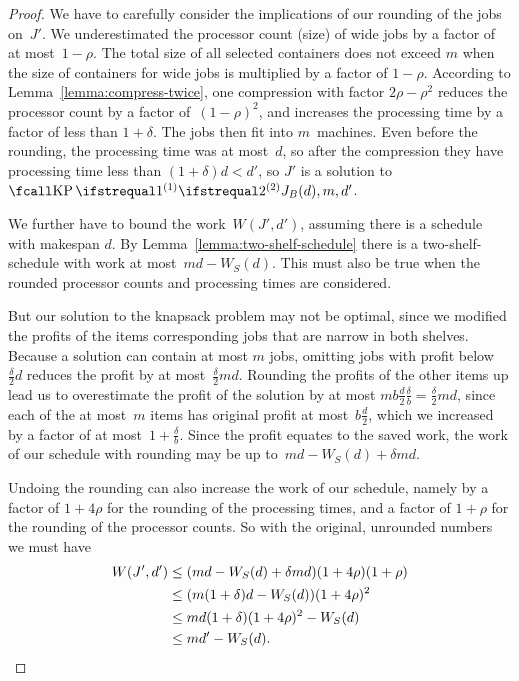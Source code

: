 \begin{proof}
  We have to carefully consider the implications of our rounding of the jobs on~$J'$.
  We underestimated the processor count (size) of wide jobs by a factor of at most~$1 - \rho$.
  The total size of all selected containers does not exceed $m$
  when the size of containers for wide jobs is multiplied by a factor of $1 - \rho$.
  According to Lemma~\ref{lemma:compress-twice},
  one compression with factor $2\rho - \rho^2$ reduces the processor count
  by a factor of~$(1 - \rho)^2$,
  and increases the processing time by a factor of less than $1 + \delta$.
  The jobs then fit into $m$~machines.
  Even before the rounding, the processing time was at most~$d$,
  so after the compression they have processing time
  less than $(1 + \delta) d < d'$,
  so $J'$ is a solution to $\KP{J_B(d)}{m, d'}$.
  
  We further have to bound the work~$W(J', d')$,
  assuming there is a schedule with makespan $d$.
  By Lemma~\ref{lemma:two-shelf-schedule}
  there is a two-shelf-schedule with work at most~$md - W_S(d)$.
  This must also be true when the rounded processor counts and processing times are considered.

  But our solution to the knapsack problem may not be optimal,
  since we modified the profits of the items corresponding jobs that are narrow in both shelves.
  Because a solution can contain at most $m$ jobs,
  omitting jobs with profit below~$\frac{\delta}{2}d$ reduces the profit by at most~$\frac{\delta}{2} m d$.
  Rounding the profits of the other items up lead us to overestimate the profit of the solution
  by at most $m b \frac{d}{2} \frac{\delta}{b} = \frac{\delta}{2} m d$,
  since each of the at most~$m$ items has original profit at most~$b \frac{d}{2}$,
  which we increased by a factor of at most~$1 + \frac{\delta}{b}$.
  Since the profit equates to the saved work,
  the work of our schedule with rounding may be up to~$md - W_S(d) + \delta m d$.

  Undoing the rounding can also increase the work of our schedule,
  namely by a factor of $1 + 4\rho$ for the rounding of the processing times,
  and a factor of $1 + \rho$ for the rounding of the processor counts.
  So with the original, unrounded numbers we must have
  \begin{equation}
    \begin{aligned}
      W(J', d') &\leq (md - W_S(d) + \delta m d)(1+4\rho)(1 + \rho) \\
      &\leq (m (1+\delta) d - W_S(d)) (1+4\rho)^2 \\
      &\leq m d (1+\delta) (1+4\rho)^2 - W_S(d) \\
      &\leq md' - W_S(d) \text{.}
    \end{aligned}
  \end{equation}
\end{proof}


